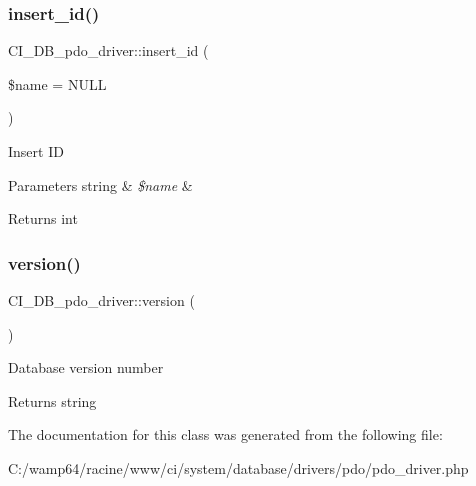 \subsubsection{\texorpdfstring{insert\+\_\+id()}{insert\_id()}}
{\footnotesize\ttfamily C\+I\+\_\+\+D\+B\+\_\+pdo\+\_\+driver\+::insert\+\_\+id (\begin{DoxyParamCaption}\item[{}]{\$name = {\ttfamily NULL} }\end{DoxyParamCaption})}

Insert ID


\begin{DoxyParams}[1]{Parameters}
string & {\em \$name} & \\
\hline
\end{DoxyParams}
\begin{DoxyReturn}{Returns}
int 
\end{DoxyReturn}
\mbox{\label{class_c_i___d_b__pdo__driver_a3feb4c1f36c41a67263c7522654fdc2d}} 
\subsubsection{\texorpdfstring{version()}{version()}}
{\footnotesize\ttfamily C\+I\+\_\+\+D\+B\+\_\+pdo\+\_\+driver\+::version (\begin{DoxyParamCaption}{ }\end{DoxyParamCaption})}

Database version number

\begin{DoxyReturn}{Returns}
string 
\end{DoxyReturn}


The documentation for this class was generated from the following file\+:\begin{DoxyCompactItemize}
\item 
C\+:/wamp64/racine/www/ci/system/database/drivers/pdo/pdo\+\_\+driver.\+php\end{DoxyCompactItemize}
